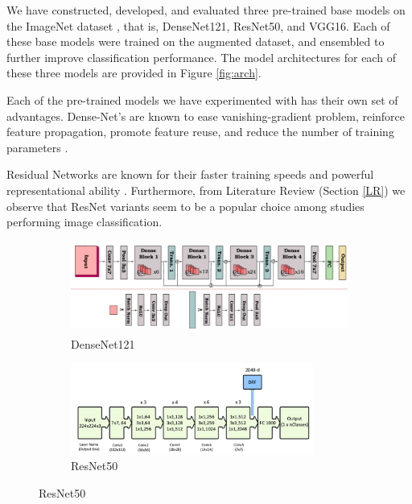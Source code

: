 We have constructed, developed, and evaluated three pre-trained base models on the ImageNet dataset \cite{IMG}, that is, DenseNet121, ResNet50, and VGG16. Each of these base models were trained on the augmented dataset, and ensembled to further improve classification performance. The model architectures for each of these three models are provided in Figure \ref{fig:arch}.

Each of the pre-trained models we have experimented with has their own set of advantages. Dense-Net's are known to ease vanishing-gradient problem, reinforce feature propagation, promote feature reuse, and reduce the number of training parameters \cite{HLW+2016}.

Residual Networks are known for their faster training speeds and powerful representational ability \cite{BAK2016, FEN2017}. Furthermore, from Literature Review (Section \ref{LR}) we observe that ResNet variants seem to be a popular choice among studies performing image classification.
\vspace{0.5em}
\begin{figure}[H]
        \begin{subfigure}[]{0.49\linewidth}
                \includegraphics[height=3cm]{Images/DenseNet121.png}
                \caption{DenseNet121 \cite{DEN}}
                \label{fig:DenseNet}
        \end{subfigure}%
        \begin{subfigure}[]{0.49\linewidth}
                \includegraphics[height=3cm]{Images/ResNet.png}
                \caption{ResNet50 \cite{MOB+2020}}
                \label{fig:ResNet}
        \end{subfigure}%

\end{figure}

